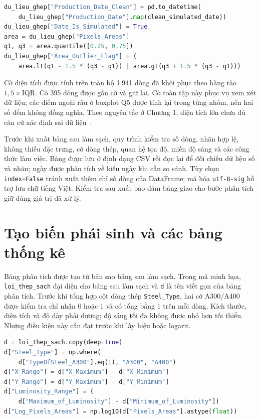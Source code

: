 \documentclass[12pt,a4paper,oneside]{report}
\newcommand{\maCot}[1]{{\urlstyle{tt}\def\UrlBreaks{\do\_\do\/\do\.}\def\UrlBigBreaks{}\nolinkurl{#1}}}
\begin{document}
\noindent\begin{minipage}{\linewidth}
\begin{lstlisting}[language=Python]
du_lieu_ghep["Production_Date_Clean"] = pd.to_datetime(
    du_lieu_ghep["Production_Date"].map(clean_simulated_date))
du_lieu_ghep["Date_Is_Simulated"] = True
area = du_lieu_ghep["Pixels_Areas"]
q1, q3 = area.quantile([0.25, 0.75])
du_lieu_ghep["Area_Outlier_Flag"] = (
    area.lt(q1 - 1.5 * (q3 - q1)) | area.gt(q3 + 1.5 * (q3 - q1)))
\end{lstlisting}
\end{minipage}\par

Cờ diện tích được tính trên toàn bộ 1.941 dòng đã khôi phục theo hàng rào $1{,}5\times\mathrm{IQR}$. Có 395 dòng được gắn cờ và giữ lại. Cờ toàn tập này phục vụ xem xét dữ liệu; các điểm ngoài râu ở boxplot Q5 được tính lại trong từng nhóm, nên hai số đếm không đồng nghĩa. Theo nguyên tắc ở Chương 1, diện tích lớn chưa đủ căn cứ xác định sai dữ liệu~\cite{nistbox}.

Trước khi xuất bảng sau làm sạch, quy trình kiểm tra số dòng, nhãn hợp lệ, không thiếu đặc trưng, cờ dòng thép, quan hệ tọa độ, miền độ sáng và các công thức làm việc. Bảng được lưu ở định dạng CSV rồi đọc lại để đối chiếu dữ liệu số và nhãn; ngày được phân tích về kiểu ngày khi cần so sánh. Tùy chọn \maCot{index=False} tránh xuất thêm chỉ số dòng của DataFrame; mã hóa \maCot{utf-8-sig} hỗ trợ lưu chữ tiếng Việt. Kiểm tra sau xuất bảo đảm bảng giao cho bước phân tích giữ đúng giá trị đã xử lý.

\section{Tạo biến phái sinh và các bảng thống kê}

Bảng phân tích được tạo từ bản sao bảng sau làm sạch. Trong mã minh họa, \maCot{loi_thep_sach} đại diện cho bảng sau làm sạch và \maCot{d} là tên viết gọn của bảng phân tích. Trước khi tổng hợp cột dòng thép \maCot{Steel_Type}, hai cờ A300/A400 được kiểm tra chỉ nhận 0 hoặc 1 và có tổng bằng 1 trên mỗi dòng. Kích thước, diện tích và độ dày phải dương; độ sáng tối đa không được nhỏ hơn tối thiểu. Những điều kiện này cần đạt trước khi lấy hiệu hoặc logarit.

\noindent\begin{minipage}{\linewidth}
\begin{lstlisting}[language=Python]
d = loi_thep_sach.copy(deep=True)
d["Steel_Type"] = np.where(
    d["TypeOfSteel_A300"].eq(1), "A300", "A400")
d["X_Range"] = d["X_Maximum"] - d["X_Minimum"]
d["Y_Range"] = d["Y_Maximum"] - d["Y_Minimum"]
d["Luminosity_Range"] = (
    d["Maximum_of_Luminosity"] - d["Minimum_of_Luminosity"])
d["Log_Pixels_Areas"] = np.log10(d["Pixels_Areas"].astype(float))
\end{lstlisting}
\end{minipage}\par
\end{document}
